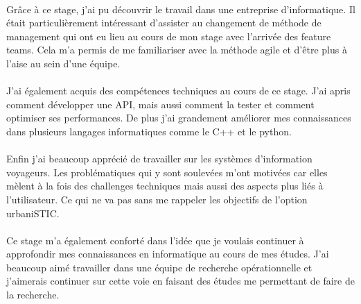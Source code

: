 \documentclass[a4paper]{report}
\begin{document}
\paragraph{} Grâce à ce stage, j'ai pu découvrir le travail dans une entreprise d'informatique. Il était particulièrement intéressant d'assister au changement de méthode de management qui ont eu lieu au cours de mon stage avec l'arrivée des feature teams. Cela m'a permis de me familiariser avec la méthode agile et d'être plus à l'aise au sein d'une équipe.

\paragraph{} J'ai également acquis des compétences techniques au cours de ce stage. J'ai apris comment développer une API, mais aussi comment la tester et comment optimiser ses performances. De plus j'ai grandement améliorer mes connaissances dans plusieurs langages informatiques comme le C++ et le python.

\paragraph{} Enfin j'ai beaucoup apprécié de travailler sur les systèmes d'information voyageurs. Les problématiques qui y sont soulevées m'ont motivées car elles mèlent à la fois des challenges techniques mais aussi des aspects plus liés à l'utilisateur. Ce qui ne va pas sans me rappeler les objectifs de l'option urbaniSTIC. 

\paragraph{} Ce stage m'a également conforté dans l'idée que je voulais continuer à approfondir mes connaissances en informatique au cours de mes études. J'ai beaucoup aimé travailler dans une équipe de recherche opérationnelle et j'aimerais continuer sur cette voie en faisant des études me permettant de faire de la recherche.

\appendix
\listoffigures
{}


\end{document}
